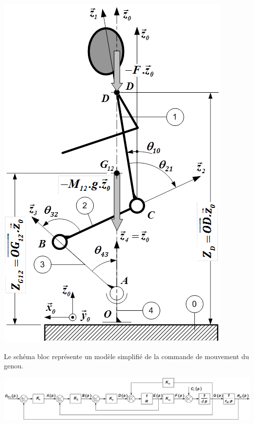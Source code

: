 \documentclass[10pt]{article}
\begin{document}
\begin{minipage}[c]{.35\linewidth}
\begin{center}
\includegraphics[width=.95\textwidth]{images/Fig01}
\end{center}
\end{minipage} 

\vspace{1cm}

Le schéma bloc représente un modèle simplifié de la commande de mouvement du genou.

\begin{center}
\includegraphics[width=\textwidth]{images/Fig02}
\end{center}
\end{document}
